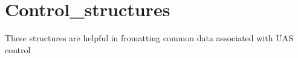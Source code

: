 \hypertarget{group__control__structures}{}\section{Control\+\_\+structures}
\label{group__control__structures}
These structures are helpful in fromatting common data associated with U\+AS control 